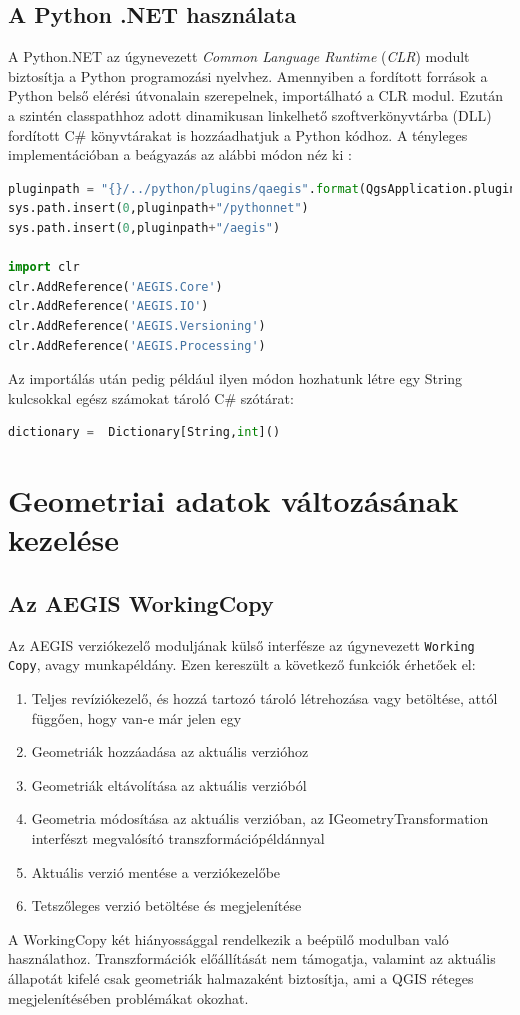 \subsection{A Python .NET használata}
A Python.NET az úgynevezett \emph{Common Language Runtime} (\emph{CLR}) modult biztosítja a Python programozási nyelvhez. Amennyiben a fordított források a Python belső elérési útvonalain szerepelnek, importálható a CLR modul. Ezután a szintén classpathhoz adott dinamikusan linkelhető szoftverkönyvtárba (DLL) fordított C\# könyvtárakat is hozzáadhatjuk a Python kódhoz. A tényleges implementációban a beágyazás az alábbi módon néz ki :
\begin{lstlisting}[language={python}]
pluginpath = "{}/../python/plugins/qaegis".format(QgsApplication.pluginPath())
sys.path.insert(0,pluginpath+"/pythonnet")
sys.path.insert(0,pluginpath+"/aegis")

import clr
clr.AddReference('AEGIS.Core')
clr.AddReference('AEGIS.IO')
clr.AddReference('AEGIS.Versioning')
clr.AddReference('AEGIS.Processing')
\end{lstlisting}
Az importálás után pedig például ilyen módon hozhatunk létre egy String kulcsokkal egész számokat tároló C\# szótárat:
\begin{lstlisting}[language={python}]
dictionary =  Dictionary[String,int]()
\end{lstlisting}

\section{Geometriai adatok változásának kezelése}
\subsection{Az AEGIS WorkingCopy}
Az AEGIS verziókezelő moduljának külső interfésze az úgynevezett \texttt{Working Copy}, avagy munkapéldány. Ezen kereszült a következő funkciók érhetőek el:
\begin{enumerate}
	\item Teljes revíziókezelő, és hozzá tartozó tároló létrehozása vagy betöltése, attól függően, hogy van-e már jelen egy
	\item Geometriák hozzáadása az aktuális verzióhoz
	\item Geometriák eltávolítása az aktuális verzióból
	\item Geometria módosítása az aktuális verzióban, az IGeometryTransformation interfészt megvalósító transzformációpéldánnyal
	\item Aktuális verzió mentése a verziókezelőbe
	\item Tetszőleges verzió betöltése és megjelenítése
\end{enumerate}
A WorkingCopy két hiányossággal rendelkezik a beépülő modulban való használathoz. Transzformációk előállítását nem támogatja, valamint az aktuális állapotát kifelé csak geometriák halmazaként biztosítja, ami a QGIS réteges megjelenítésében problémákat okozhat.

